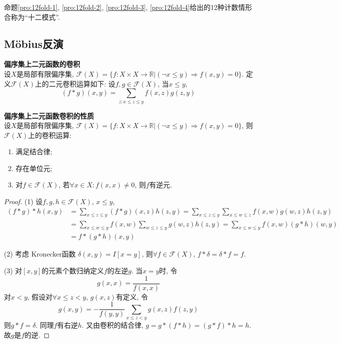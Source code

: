 \par 命题\ref{pro:12fold-1}, \ref{pro:12fold-2}, \ref{pro:12fold-3}, \ref{pro:12fold-4}给出的12种计数情形合称为“十二模式”.

\subsection{Möbius反演}

\begin{dfn} \textbf{偏序集上二元函数的卷积}\\
设$X$是局部有限偏序集, $\mathcal{F}(X)=\{f: X\times X\to \mathbb{R}\vert (\lnot x\le y) \Rightarrow f(x,y)=0\}$. 定义$\mathcal{F}(X)$上的二元卷积运算如下: 设$f,g\in \mathcal{F}(X)$, 当$x\le y$, 
\begin{equation}
    (f * g) (x,y) = \sum_{z: x\le z\le y} f(x,z)g(z,y)
\end{equation}
\end{dfn}

\begin{pro} \textbf{偏序集上二元函数卷积的性质}\\
设$X$是局部有限偏序集, $\mathcal{F}(X)=\{f: X\times X\to \mathbb{R}\vert (\lnot x\le y) \Rightarrow f(x,y)=0\}$, 则$\mathcal{F}(X)$上的卷积运算: 
\begin{enumerate}
    \item 满足结合律;
    \item 存在单位元;
    \item 对$f\in \mathcal{F}(X)$, 若$\forall x\in X: f(x,x)\neq 0$, 则$f$有逆元. 
\end{enumerate}
\end{pro}
\begin{proof}
(1) 设$f,g,h\in \mathcal{F}(X)$, $x\le y$, 
\begin{align*}
    (f*g)*h(x,y)&=\sum_{x\le z\le y} (f*g)(x,z) h(z,y)
    = \sum_{x\le z\le y} \sum_{x\le w\le z}f(x,w) g(w,z) h(z,y)\\
    &= \sum_{x\le w\le y} f(x,w) \sum_{w\le z\le y} g(w,z) h(z,y) = \sum_{x\le w\le y} f(x,w) (g*h)(w,y) \\
    &= f*(g*h)(x,y)
\end{align*}
\par (2) 考虑 Kronecker函数 $\delta (x,y)=I[x=y]$, 则$\forall f\in \mathcal{F}(X)$, $f * \delta = \delta*f = f$. 
\par (3) 对$[x,y]$的元素个数归纳定义$f$的左逆$g$. 当$x=y$时, 令 
\begin{equation}
    g(x,x)=\frac{1}{f(x,x)}
\end{equation}
对$x<y$, 假设对$\forall x \le z < y$, $g(x,z)$有定义, 令 
\begin{equation}
    g(x,y)=-\frac{1}{f(y,y)}\sum_{x\le z<y} g(x,z)f(z,y)
\end{equation}
则$g*f=\delta$. 同理$f$有右逆$h$. 又由卷积的结合律, $g = g*(f*h)=(g*f)*h=h$. 故$g$是$f$的逆. 
\end{proof}


